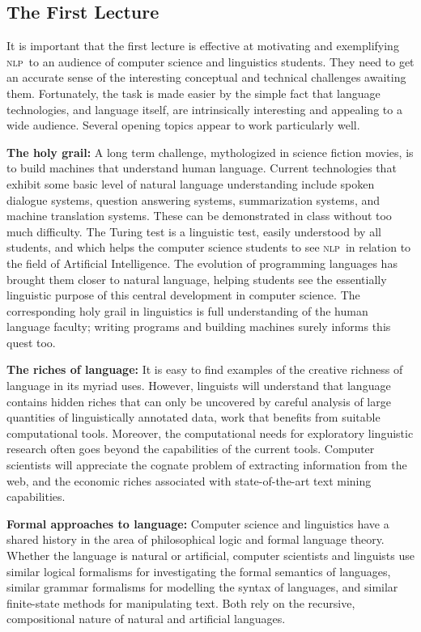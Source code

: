 \documentclass[11pt]{article}
\newcommand{\NLP}{\textsc{nlp}}
\begin{document}
\subsection{The First Lecture}

It is important that the first lecture is effective at motivating and
exemplifying \NLP\ to an audience of computer science and linguistics
students.  They need to get an accurate sense of the interesting
conceptual and technical challenges awaiting them.  Fortunately, the
task is made easier by the simple fact that language technologies, and
language itself, are intrinsically interesting and appealing to a wide audience.
Several opening topics appear to work particularly well.

\textbf{The holy grail:}
A long term challenge, mythologized in science fiction movies, is to
build machines that understand human language.  Current technologies
that exhibit some basic level of natural language understanding include
spoken dialogue systems, question answering systems, summarization
systems, and machine translation systems.  These can be demonstrated
in class without too much difficulty.  The Turing test is a linguistic
test, easily understood by all students, and which helps the computer science
students to see \NLP\ in relation to the field of Artificial Intelligence.
The evolution of programming languages has brought them closer to natural language,
helping students see the essentially linguistic purpose of this central development
in computer science.  The corresponding holy grail in linguistics is full
understanding of the human language faculty; writing programs and building machines
surely informs this quest too.

\textbf{The riches of language:}
It is easy to find examples of the creative richness of language in
its myriad uses.  However, linguists will understand that language
contains hidden riches that can only be uncovered by careful analysis
of large quantities of linguistically annotated data, work that
benefits from suitable computational tools.  Moreover, the
computational needs for exploratory linguistic research often goes
beyond the capabilities of the current tools.  Computer scientists
will appreciate the cognate problem of extracting information from the
web, and the economic riches associated with state-of-the-art text
mining capabilities.

\textbf{Formal approaches to language:}
Computer science and linguistics have a shared history in the area of
philosophical logic and formal language theory.  Whether the language
is natural or artificial, computer scientists and linguists use
similar logical formalisms for investigating the formal semantics of
languages, similar grammar formalisms for modelling the syntax of
languages, and similar finite-state methods for manipulating text.
Both rely on the recursive, compositional nature of natural and
artificial languages.
\end{document}
